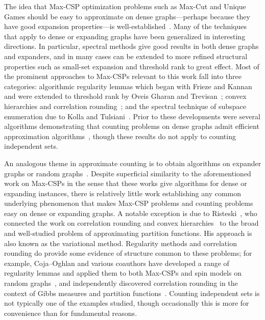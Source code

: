 \documentclass[11pt,letterpaper]{amsart}
\theoremstyle{definition}
\begin{document}
The idea that Max-CSP optimization problems such as Max-Cut and Unique Games should be easy to approximate on dense graphs---perhaps because they have good expansion properties---is well-established~\cite{AKK95,Fri96,FK96}.
Many of the techniques that apply to dense or expanding graphs have been generalized in interesting directions. 
In particular, spectral methods give good results in both dense graphs and expanders, and in many cases can be extended to more refined structural properties such as small-set expansion and threshold rank to great effect.
Most of the prominent approaches to Max-CSPs relevant to this work fall into three categories: algorithmic regularity lemmas which began with Frieze and Kannan~\cite{FK96} and were extended to threshold rank by Oveis Gharan and Trevisan~\cite{OT13a}; convex hierarchies and correlation rounding~\cite{AKK+08,BRS11a,GS11a}; and the spectral technique of subspace enumeration due to Kolla and Tulsiani~\cite{Kol10,KT07}. 
Prior to these developments were several algorithms demonstrating that counting problems on dense graphs admit efficient approximation algorithms~\cite{Ann94,DFJ94,JS89}, though these results do not apply to counting independent sets. 

An analogous theme in approximate counting is to obtain algorithms on expander graphs or random graphs~\cite{BGG+18,CDF+22a,GGS20,HJP23,JKP19b}.
Despite superficial similarity to the aforementioned work on Max-CSPs in the sense that these works give algorithms for dense or expanding instances, there is relatively little work establishing any common underlying phenomenon that makes Max-CSP problems and counting problems easy on dense or expanding graphs. 
A notable exception is due to Risteski~\cite{Ris16}, who connected the work on correlation rounding and convex hierarchies~\cite{BRS11a} to the broad and well-studied problem of approximating partition functions. His approach is also known as the variational method.
Regularity methods and correlation rounding do provide some evidence of structure common to these problems; for example, Coja--Oghlan and various coauthors have developed a range of regularity lemmas and applied them to both Max-CSPs and spin models on random graphs~\cite{BC16,CCF10,CP16}, and independently discovered correlation rounding in the context of Gibbs measures and partition functions~\cite{CP19a}. 
Counting independent sets is not typically one of the examples studied, though occasionally this is more for convenience than for fundamental reasons. 
\end{document}
